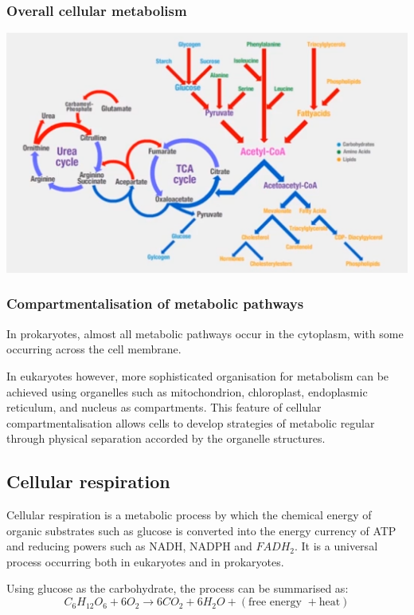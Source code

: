 \documentclass[11pt]{article}
\begin{document}
\subsubsection{Overall cellular metabolism}
\label{sec:orgdbfec2e}
\begin{center}
\includegraphics[width=.9\linewidth]{./images/overall-cellular-metabolism.png}
\end{center}

\newpage
\subsubsection{Compartmentalisation of metabolic pathways}
\label{sec:org99abb6e}
In prokaryotes, almost all metabolic pathways occur in the cytoplasm, with some occurring across the cell membrane.


In eukaryotes however, more sophisticated organisation for metabolism can be achieved using organelles such as mitochondrion, chloroplast, endoplasmic reticulum, and nucleus as compartments. This feature of cellular compartmentalisation allows cells to develop strategies of metabolic regular through physical separation accorded by the organelle structures.
\subsection{Cellular respiration}
\label{sec:org9e2c8f9}
Cellular respiration is a metabolic process by which the chemical energy of organic substrates such as glucose is converted into the energy currency of ATP and reducing powers such as NADH, NADPH and \(FADH_2\). It is a universal process occurring both in eukaryotes and in prokaryotes.


Using glucose as the carbohydrate, the process can be summarised as:
\[C_6 H_{12} O_6 + 6O_2 \rightarrow 6CO_2 + 6H_2O + (\text{free energy } + \text{heat})\]
\end{document}
